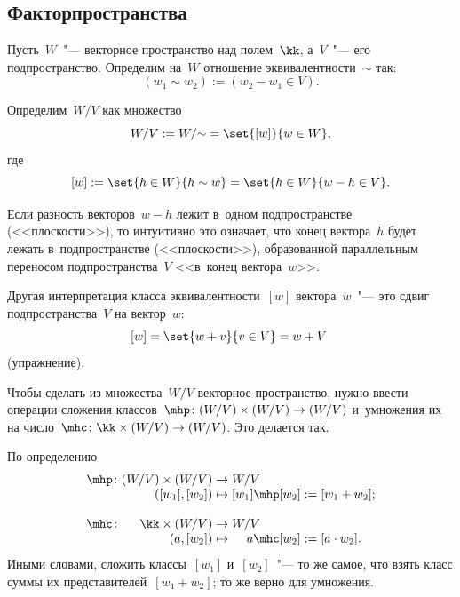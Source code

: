 	\subsection{Факторпространства}
	\begin{definition}
		Пусть~$W$~"--- векторное пространство над полем~$\kk$, а~$V$~"--- его
		подпространство. Определим на~$W$ отношение эквивалентности~$\sim$ так:
		\[
			(w_1 \sim w_2) :=
			(w_2 - w_1 \in V).
		\]

		Определим~$W/V$ как множество
		\[
			W/V := W/{\sim} =
			\set{[w]}{w \in W},
		\]
		где
		\[
			[w] := \set{h \in W}{h \sim w} = \set{h \in W}{w - h \in V}
			.
		\]

		Если разность векторов~$w - h$ лежит в~одном подпространстве
		(<<плоскости>>), то интуитивно это означает, что конец вектора~$h$
		будет лежать в~подпространстве (<<плоскости>>), образованной
		параллельным переносом подпространства~$V$ <<в~конец вектора~$w$>>.

		Другая интерпретация класса эквивалентности~$[w]$ вектора~$w$~"--- это
			сдвиг подпространства~$V$ на вектор~$w$:
		\[
			[w] = \set{w + v}{v \in V} = w + V~\]
		(упражнение).
		\label{<+label+>}
	\end{definition}


	Чтобы сделать из множества~$W/V$ векторное пространство, нужно ввести
	операции сложения классов~$\mhp \colon (W/V) \times (W/V) \to (W/V)$
	и~умножения их на число~$\mhc \colon \kk \times (W/V) \to (W/V)$. Это
	делается так.

	\begin{definition}
		По определению
		\[
			\begin{array}{r@{}r@{}c@{}r@{}c@{}l}
				\mhp
				\colon
				{}
				&
				(W/V) \times (W/V)
				&
				{} \to {}
				&
				\multicolumn{1}{@{}l@{}}{W/V}
				&&
				\\
				&
				([w_1], [w_2])
				&
				{} \mapsto {} 
				&
				[w_1] \mhp [w_2]
				&
				{} := {}
				&
				[w_1 + w_2];
				\\
				\\
				\mhc
				\colon
				{}
				&
				\kk \times (W/V) 
				&
				{} \to {}
				&
				\multicolumn{1}{@{}l@{}}{W/V}
				&&
				\\
				&
				(a, [w_2])
				&
				{} \mapsto {}
				&
				a \mhc [w_2]
				&
				{} := {}
				&
				[a \cdot w_2].
			\end{array}
		\]
		Иными словами, сложить классы~$[w_1]$ и~$[w_2]$~"--- то же самое, что
		взять класс суммы их представителей~$[w_1 + w_2]$; то же верно для
		умножения.
	\end{definition}

